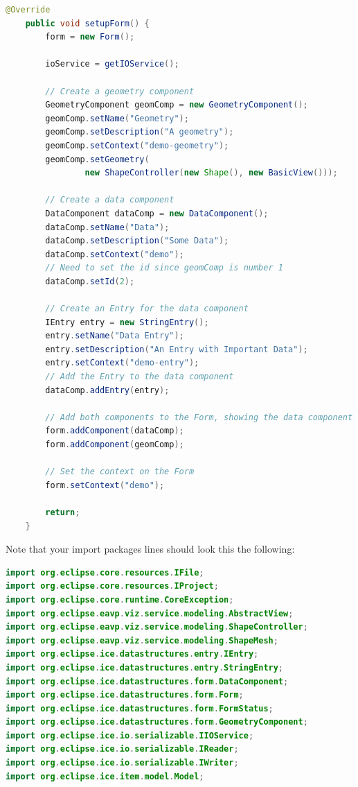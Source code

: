 \begin{lstlisting}[language=java]
@Override
    public void setupForm() {
		form = new Form();

		ioService = getIOService();

		// Create a geometry component
		GeometryComponent geomComp = new GeometryComponent();
		geomComp.setName("Geometry");
		geomComp.setDescription("A geometry");
		geomComp.setContext("demo-geometry");
		geomComp.setGeometry(
				new ShapeController(new Shape(), new BasicView()));

		// Create a data component
		DataComponent dataComp = new DataComponent();
		dataComp.setName("Data");
		dataComp.setDescription("Some Data");
		dataComp.setContext("demo");
		// Need to set the id since geomComp is number 1
		dataComp.setId(2);

		// Create an Entry for the data component
		IEntry entry = new StringEntry();
		entry.setName("Data Entry");
		entry.setDescription("An Entry with Important Data");
		entry.setContext("demo-entry");
		// Add the Entry to the data component
		dataComp.addEntry(entry);

		// Add both components to the Form, showing the data component first.
		form.addComponent(dataComp);
		form.addComponent(geomComp);

		// Set the context on the Form
		form.setContext("demo");

		return;
    }
\end{lstlisting}

Note that your import packages lines should look this the following:

\begin{lstlisting}[language=java]
import org.eclipse.core.resources.IFile;
import org.eclipse.core.resources.IProject;
import org.eclipse.core.runtime.CoreException;
import org.eclipse.eavp.viz.service.modeling.AbstractView;
import org.eclipse.eavp.viz.service.modeling.ShapeController;
import org.eclipse.eavp.viz.service.modeling.ShapeMesh;
import org.eclipse.ice.datastructures.entry.IEntry;
import org.eclipse.ice.datastructures.entry.StringEntry;
import org.eclipse.ice.datastructures.form.DataComponent;
import org.eclipse.ice.datastructures.form.Form;
import org.eclipse.ice.datastructures.form.FormStatus;
import org.eclipse.ice.datastructures.form.GeometryComponent;
import org.eclipse.ice.io.serializable.IIOService;
import org.eclipse.ice.io.serializable.IReader;
import org.eclipse.ice.io.serializable.IWriter;
import org.eclipse.ice.item.model.Model;
\end{lstlisting}

